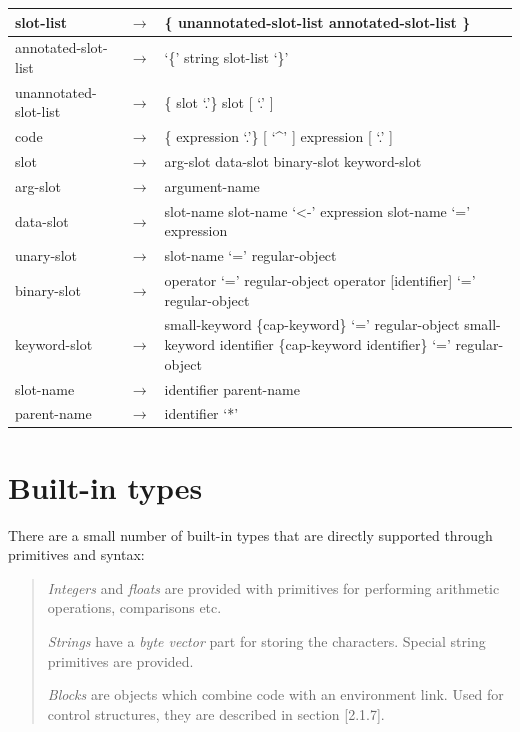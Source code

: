 \documentclass[letterpaper,10pt,english]{sphinxmanual}
\begin{document}
\begin{tabulary}{\linewidth}{|L|L|L|}
slot-list
 & 
\(\rightarrow\)
 & 
\{ unannotated-slot-list \textbar{} annotated-slot-list \}
\\\hline

annotated-slot-list
 & 
\(\rightarrow\)
 & 
‘\{’ string slot-list ‘\}’
\\\hline

unannotated-slot-list
 & 
\(\rightarrow\)
 & 
\{ slot ‘.’\} slot {[} ‘.’ {]}
\\\hline

code
 & 
\(\rightarrow\)
 & 
\{ expression ‘.’\} {[} ‘\textasciicircum{}’ {]} expression {[} ‘.’ {]}
\\\hline

slot
 & 
\(\rightarrow\)
 & 
arg-slot \textbar{} data-slot \textbar{} binary-slot \textbar{} keyword-slot
\\\hline

arg-slot
 & 
\(\rightarrow\)
 & 
argument-name
\\\hline

data-slot
 & 
\(\rightarrow\)
 & 
slot-name \textbar{} slot-name ‘\textless{}-’ expression \textbar{} slot-name ‘=’ expression
\\\hline

unary-slot
 & 
\(\rightarrow\)
 & 
slot-name ‘=’ regular-object
\\\hline

binary-slot
 & 
\(\rightarrow\)
 & 
operator ‘=’ regular-object \textbar{} operator {[}identifier{]} ‘=’ regular-object
\\\hline

keyword-slot
 & 
\(\rightarrow\)
 & 
small-keyword \{cap-keyword\} ‘=’ regular-object \textbar{} small-keyword identifier \{cap-keyword identifier\} ‘=’ regular-object
\\\hline

slot-name
 & 
\(\rightarrow\)
 & 
identifier \textbar{} parent-name
\\\hline

parent-name
 & 
\(\rightarrow\)
 & 
identifier ‘*’
\\\hline
\end{tabulary}



\section{Built-in types}
\label{builtintypes::doc}\label{builtintypes:built-in-types}
There are a small number of built-in types that are directly supported through primitives and syntax:
\begin{quote}

\emph{Integers} and \emph{floats} are provided with primitives for performing arithmetic operations, comparisons etc.

\emph{Strings} have a \emph{byte vector} part for storing the characters. Special string primitives are provided.

\emph{Blocks} are objects which combine code with an environment link. Used for control structures, they are described in section {[}2.1.7{]}.
\end{quote}
\end{document}
